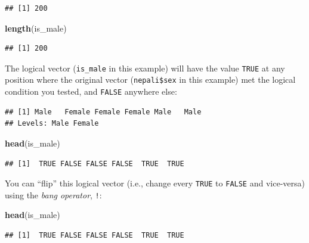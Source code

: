 \documentclass[]{book}
\makeatletter
\newenvironment{Shaded}{\begin{snugshade}}{\end{snugshade}}
\newcommand{\KeywordTok}[1]{\textcolor[rgb]{0.13,0.29,0.53}{\textbf{#1}}}
\newcommand{\OperatorTok}[1]{\textcolor[rgb]{0.81,0.36,0.00}{\textbf{#1}}}
\newcommand{\NormalTok}[1]{#1}
\newenvironment{kframe}{%
\medskip{}
\setlength{\fboxsep}{.8em}
 \def\at@end@of@kframe{}%
 \ifinner\ifhmode%
  \def\at@end@of@kframe{\end{minipage}}%
  \begin{minipage}{\columnwidth}%
 \fi\fi%
 \def\FrameCommand##1{\hskip\@totalleftmargin \hskip-\fboxsep
 \colorbox{shadecolor}{##1}\hskip-\fboxsep
     \hskip-\linewidth \hskip-\@totalleftmargin \hskip\columnwidth}%
 \MakeFramed {\advance\hsize-\width
   \@totalleftmargin\z@ \linewidth\hsize
   \@setminipage}}%
 {\par\unskip\endMakeFramed%
 \at@end@of@kframe}
\renewenvironment{Shaded}{\begin{kframe}}{\end{kframe}}
\theoremstyle{definition}
\theoremstyle{definition}
\theoremstyle{definition}
\theoremstyle{remark}
\makeatother
\begin{document}
\begin{verbatim}
## [1] 200
\end{verbatim}

\begin{Shaded}
\begin{Highlighting}[]
\KeywordTok{length}\NormalTok{(is_male)}
\end{Highlighting}
\end{Shaded}

\begin{verbatim}
## [1] 200
\end{verbatim}

The logical vector (\texttt{is\_male} in this example) will have the
value \texttt{TRUE} at any position where the original vector
(\texttt{nepali\$sex} in this example) met the logical condition you
tested, and \texttt{FALSE} anywhere else:

\begin{Shaded}
\end{Shaded}

\begin{verbatim}
## [1] Male   Female Female Female Male   Male  
## Levels: Male Female
\end{verbatim}

\begin{Shaded}
\begin{Highlighting}[]
\KeywordTok{head}\NormalTok{(is_male)}
\end{Highlighting}
\end{Shaded}

\begin{verbatim}
## [1]  TRUE FALSE FALSE FALSE  TRUE  TRUE
\end{verbatim}

You can ``flip'' this logical vector (i.e., change every \texttt{TRUE}
to \texttt{FALSE} and vice-versa) using the \emph{bang operator},
\texttt{!}:

\begin{Shaded}
\begin{Highlighting}[]
\KeywordTok{head}\NormalTok{(is_male)}
\end{Highlighting}
\end{Shaded}

\begin{verbatim}
## [1]  TRUE FALSE FALSE FALSE  TRUE  TRUE
\end{verbatim}
\end{document}
